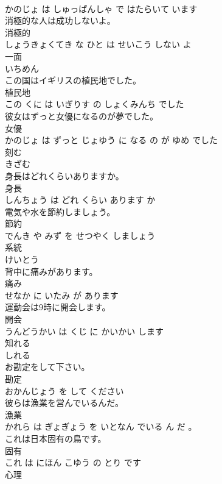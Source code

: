 \documentclass[8pt]{extreport}
\begin{document}
\begin{CJK}{UTF8}{min}
\\	かのじょ は しゅっぱんしゃ で はたらいて います			
\\	消極的な人は成功しないよ。	
\\	消極的 
\\	しょうきょくてき な ひと は せいこう しない よ			
\\	一面	
\\	いちめん		
\\	この国はイギリスの植民地でした。	
\\	植民地 
\\	この くに は いぎりす の しょくみんち でした			
\\	彼女はずっと女優になるのが夢でした。	
\\	女優 
\\	かのじょ は ずっと じょゆう に なる の が ゆめ でした			
\\	刻む	
\\	きざむ		
\\	身長はどれくらいありますか。	
\\	身長 
\\	しんちょう は どれ くらい あります か			
\\	電気や水を節約しましょう。	
\\	節約 
\\	でんき や みず を せつやく しましょう			
\\	系統	
\\	けいとう		
\\	背中に痛みがあります。	
\\	痛み 
\\	せなか に いたみ が あります			
\\	運動会は9時に開会します。	
\\	開会 
\\	うんどうかい は くじ に かいかい します			
\\	知れる	
\\	しれる		
\\	お勘定をして下さい。	
\\	勘定 
\\	おかんじょう を して ください			
\\	彼らは漁業を営んでいるんだ。	
\\	漁業 
\\	かれら は ぎょぎょう を いとなん でいる ん だ 。			
\\	これは日本固有の鳥です。	
\\	固有 
\\	これ は にほん こゆう の とり です			
\\	心理	

\end{CJK}
\end{document}
